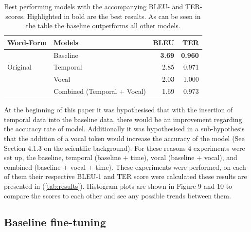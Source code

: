 \begin{table}[h]
    \caption{Best performing models with the accompanying BLEU- and TER-scores. Highlighted in bold are the best results. As can be seen in the table the baseline outperforms all other models.}
    \label{tab:results}
    \begin{tabular}{llrr}
        \toprule
                                                                  
        Word-Form                   &  Models                           &  BLEU                & TER    \\ 
        \midrule
        \multirow{3}{*}{Original}  &  Baseline                              &   \textbf{3.69}      &  \textbf{0.960} \\
                              & Temporal                                &   2.85               &  0.971 \\
                              & Vocal                                   &   2.03               &  1.000 \\
                              & Combined (Temporal + Vocal)             &   1.69               &  0.973 \\
    
        
    \end{tabular}
    
\end{table}


At the beginning of this paper it was hypothesised that with the insertion of temporal data into the baseline data, there would be an improvement regarding the accuracy rate of model. Additionally it was hypothesised in a sub-hypothesis that the addition of a vocal token would increase the accuracy of the model (See Section 4.1.3 on the scientific background). For these reasons $4$ experiments were set up, the baseline, temporal (baseline + time), vocal (baseline + vocal), and combined (baseline + vocal + time). These experiments were performed, on each of them their respective BLEU-1 and TER score were calculated these results are presented in (\autoref{tab:results}). Histogram plots are shown in Figure 9 and 10 to compare the scores to each other and see any possible trends between them.

\subsection{Baseline fine-tuning}


